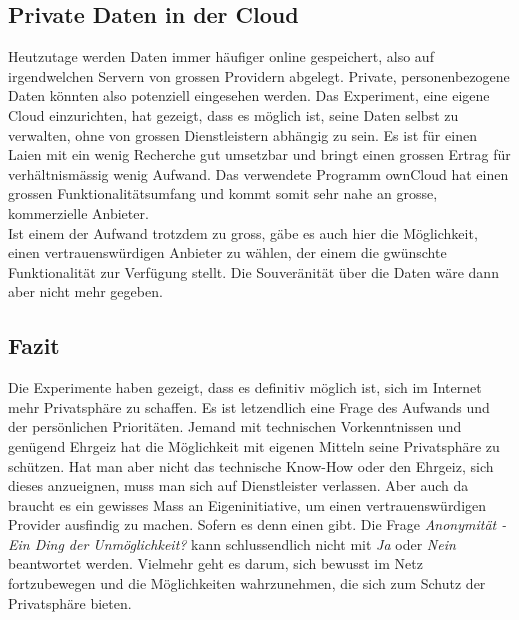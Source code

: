\subsection{Private Daten in der Cloud}
Heutzutage werden Daten immer häufiger online gespeichert, also auf irgendwelchen Servern von grossen Providern abgelegt. 
Private, personenbezogene Daten könnten also potenziell eingesehen werden. Das Experiment, eine eigene Cloud einzurichten, hat gezeigt, dass es möglich ist, seine Daten selbst zu verwalten, ohne von grossen Dienstleistern abhängig zu sein.
Es ist für einen Laien mit ein wenig Recherche gut umsetzbar und bringt einen grossen Ertrag für verhältnismässig wenig Aufwand.
Das verwendete Programm ownCloud hat einen grossen Funktionalitätsumfang und kommt somit sehr nahe an grosse, kommerzielle Anbieter.
\\
Ist einem der Aufwand trotzdem zu gross, gäbe es auch hier die Möglichkeit, einen vertrauenswürdigen Anbieter zu wählen, der einem die gwünschte Funktionalität zur Verfügung stellt.
Die Souveränität über die Daten wäre dann aber nicht mehr gegeben.

\subsection{Fazit}
Die Experimente haben gezeigt, dass es definitiv möglich ist, sich im Internet mehr Privatsphäre zu schaffen.
Es ist letzendlich eine Frage des Aufwands und der persönlichen Prioritäten. Jemand mit technischen Vorkenntnissen und genügend Ehrgeiz hat die Möglichkeit mit eigenen Mitteln seine Privatsphäre zu schützen. Hat man aber nicht das technische Know-How oder den Ehrgeiz, sich dieses anzueignen, muss man sich auf Dienstleister verlassen. Aber auch da braucht es ein gewisses Mass an Eigeninitiative, um einen vertrauenswürdigen Provider ausfindig zu machen. Sofern es denn einen gibt.
Die Frage \textit{Anonymität - Ein Ding der Unmöglichkeit?} kann schlussendlich nicht mit \textit{Ja} oder \textit{Nein} beantwortet werden. Vielmehr geht es darum, sich bewusst im Netz fortzubewegen und die Möglichkeiten wahrzunehmen, die sich zum Schutz der Privatsphäre bieten.
